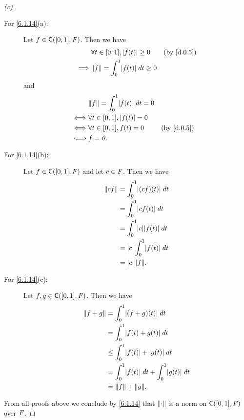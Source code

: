 \begin{proof}[(c)]
	\begin{description}
		\item[For \cref{6.1.14}(a):]
			Let \(f \in \cfs([0, 1], \F)\).
			Then we have
			\begin{align*}
				         & \forall t \in [0, 1], \abs{f(t)} \geq 0     &  & \by{d.0.5} \\
				\implies & \norm{f} = \int_0^1 \abs{f(t)} \; dt \geq 0
			\end{align*}
			and
			\begin{align*}
				     & \norm{f} = \int_0^1 \abs{f(t)} \; dt = 0                 \\
				\iff & \forall t \in [0, 1], \abs{f(t)} = 0                     \\
				\iff & \forall t \in [0, 1], f(t) = 0           &  & \by{d.0.5} \\
				\iff & f = \zv.
			\end{align*}
		\item[For \cref{6.1.14}(b):]
			Let \(f \in \cfs([0, 1], \F)\) and let \(c \in \mathit{F}\).
			Then we have
			\begin{align*}
				\norm{cf} & = \int_0^1 \abs{(cf)(t)} \; dt      \\
				          & = \int_0^1 \abs{cf(t)} \; dt        \\
				          & = \int_0^1 \abs{c} \abs{f(t)} \; dt \\
				          & = \abs{c} \int_0^1 \abs{f(t)} \; dt \\
				          & = \abs{c} \norm{f}.
			\end{align*}
		\item[For \cref{6.1.14}(c):]
			Let \(f, g \in \cfs([0, 1], \F)\).
			Then we have
			\begin{align*}
				\norm{f + g} & = \int_0^1 \abs{(f + g)(t)} \; dt                       \\
				             & = \int_0^1 \abs{f(t) + g(t)} \; dt                      \\
				             & \leq \int_0^1 \abs{f(t)} + \abs{g(t)} \; dt             \\
				             & = \int_0^1 \abs{f(t)} \; dt + \int_0^1 \abs{g(t)} \; dt \\
				             & = \norm{f} + \norm{g}.
			\end{align*}
	\end{description}
	From all proofs above we conclude by \cref{6.1.14} that \(\left\lVert\cdot\right\rVert\) is a norm on \(\cfs([0, 1], \F)\) over \(\mathit{F}\).
\end{proof}

